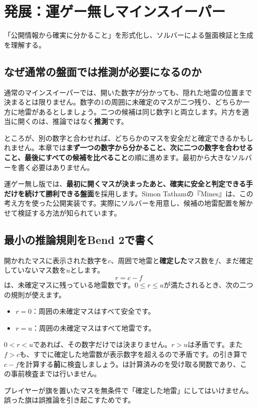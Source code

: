 \documentclass[11pt,a4paper,openany]{book}
\newcommand{\code}[1]{\texttt{\detokenize{#1}}}
\newcommand{\term}[1]{\textbf{#1}}
\newcommand{\sectiongoal}[1]{%
\begin{tcolorbox}[colback=blue!3,colframe=blue!16,
 boxrule=.35pt,arc=1mm,left=3mm,right=3mm,top=2mm,bottom=2mm]
\small #1
\end{tcolorbox}}
\begin{document}
\chapter{発展：運ゲー無しマインスイーパー}
\sectiongoal{「公開情報から確実に分かること」を形式化し、ソルバーによる盤面検証と生成を理解する。}

\section{なぜ通常の盤面では推測が必要になるのか}
通常のマインスイーパーでは、開いた数字が分かっても、隠れた地雷の位置まで決まるとは限りません。数字の1の周囲に未確定のマスが二つ残り、どちらか一方に地雷があるとしましょう。二つの候補は同じ数字1と両立します。片方を適当に開くのは、推論ではなく\term{推測}です。

ところが、別の数字と合わせれば、どちらかのマスを安全だと確定できるかもしれません。本章では\textbf{まず一つの数字から分かること、次に二つの数字を合わせること、最後にすべての候補を比べること}の順に進めます。最初から大きなソルバーを書く必要はありません。

運ゲー無し版では、\textbf{最初に開くマスが決まったあと、確実に安全と判定できる手だけを続けて勝利できる盤面}を採用します。Simon Tathamの『Mines』は、この考え方を使った公開実装です。実際にソルバーを用意し、候補の地雷配置を解かせて検証する方法が知られています。

\section{最小の推論規則をBend 2で書く}
開かれたマスに表示された数字を\(c\)、周囲で地雷と\textbf{確定した}マス数を\(f\)、まだ確定していないマス数を\(u\)とします。
\[
r=c-f
\]
は、未確定マスに残っている地雷数です。\(0\le r\le u\)が満たされるとき、次の二つの規則が使えます。
\begin{itemize}[leftmargin=*]
\item \(r=0\)：周囲の未確定マスはすべて安全です。
\item \(r=u\)：周囲の未確定マスはすべて地雷です。
\end{itemize}
\(0<r<u\)であれば、その数字だけでは決まりません。\(r>u\)は矛盾です。また\(f>c\)も、すでに確定した地雷数が表示数字を超えるので矛盾です。\code{U32}の引き算で\(c-f\)を計算する\textbf{前}に検査しましょう。\code{infer}は計算済みの\code{remaining}を受け取る関数であり、この事前検査までは行いません。

プレイヤーが旗を置いたマスを無条件で「確定した地雷」にしてはいけません。誤った旗は誤推論を引き起こすためです。
\end{document}
